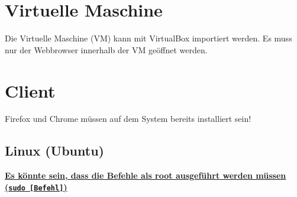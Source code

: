\section{Virtuelle Maschine}
Die Virtuelle Maschine (VM) kann mit VirtualBox importiert werden. Es muss nur der Webbrowser innerhalb der VM geöffnet werden.

\section{Client}
Firefox und Chrome müssen auf dem System bereits installiert sein!
\subsection{Linux (Ubuntu)}
\underline{\textbf{Es könnte sein, dass die Befehle als root ausgeführt werden müssen (\texttt{sudo [Befehl]})}}

